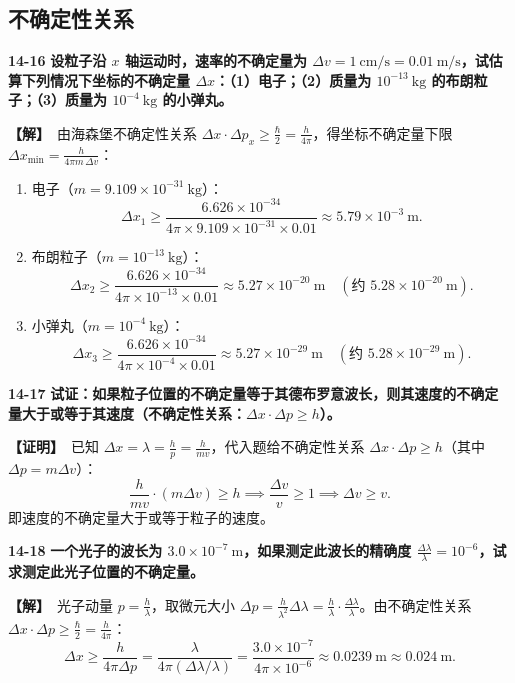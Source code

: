 \documentclass[zihao=5,a4paper,UTF8]{ctexart}
\newenvironment{prob}[2]{%
    \par\vspace{6pt}\noindent\textbf{\color{navy}#1} \textbf{#2}\par\nopagebreak\vspace{2pt}%
}{%
    \par\vspace{4pt}%
}
\newcommand{\sol}{\noindent\textbf{\color{tealaccent}【解】}\ }
\newcommand{\proofbegin}{\noindent\textbf{\color{tealaccent}【证明】}\ }
\begin{document}
\subsection{不确定性关系}

\begin{prob}{14-16}{设粒子沿 $x$ 轴运动时，速率的不确定量为 $\Delta v = 1\ \mathrm{cm/s} = 0.01\ \mathrm{m/s}$，试估算下列情况下坐标的不确定量 $\Delta x$：（1）电子；（2）质量为 $10^{-13}\ \mathrm{kg}$ 的布朗粒子；（3）质量为 $10^{-4}\ \mathrm{kg}$ 的小弹丸。}
\sol 由海森堡不确定性关系 $\Delta x\cdot \Delta p_x \ge \frac{\hbar}{2} = \frac{h}{4\pi}$，得坐标不确定量下限 $\Delta x_{\min} = \frac{h}{4\pi m\,\Delta v}$：
\begin{enumerate}[leftmargin=2em, itemsep=2pt]
    \item 电子（$m = 9.109\times 10^{-31}\ \mathrm{kg}$）：
    \[
        \Delta x_1 \ge \frac{6.626\times 10^{-34}}{4\pi\times 9.109\times 10^{-31}\times 0.01} \approx 5.79\times 10^{-3}\ \mathrm{m}.
    \]
    \item 布朗粒子（$m = 10^{-13}\ \mathrm{kg}$）：
    \[
        \Delta x_2 \ge \frac{6.626\times 10^{-34}}{4\pi\times 10^{-13}\times 0.01} \approx 5.27\times 10^{-20}\ \mathrm{m}\quad (\text{约 } 5.28\times 10^{-20}\ \mathrm{m}).
    \]
    \item 小弹丸（$m = 10^{-4}\ \mathrm{kg}$）：
    \[
        \Delta x_3 \ge \frac{6.626\times 10^{-34}}{4\pi\times 10^{-4}\times 0.01} \approx 5.27\times 10^{-29}\ \mathrm{m}\quad (\text{约 } 5.28\times 10^{-29}\ \mathrm{m}).
    \]
\end{enumerate}
\end{prob}

\begin{prob}{14-17}{试证：如果粒子位置的不确定量等于其德布罗意波长，则其速度的不确定量大于或等于其速度（不确定性关系：$\Delta x\cdot \Delta p \ge h$）。}
\proofbegin 已知 $\Delta x = \lambda = \frac{h}{p} = \frac{h}{mv}$，代入题给不确定性关系 $\Delta x\cdot \Delta p \ge h$（其中 $\Delta p = m\Delta v$）：
\[
    \frac{h}{mv}\cdot (m\Delta v) \ge h \implies \frac{\Delta v}{v} \ge 1 \implies \Delta v \ge v.
\]
即速度的不确定量大于或等于粒子的速度。
\end{prob}

\begin{prob}{14-18}{一个光子的波长为 $3.0\times 10^{-7}\ \mathrm{m}$，如果测定此波长的精确度 $\frac{\Delta\lambda}{\lambda} = 10^{-6}$，试求测定此光子位置的不确定量。}
\sol 光子动量 $p = \frac{h}{\lambda}$，取微元大小 $\Delta p = \frac{h}{\lambda^2}\Delta\lambda = \frac{h}{\lambda}\cdot\frac{\Delta\lambda}{\lambda}$。由不确定性关系 $\Delta x\cdot \Delta p \ge \frac{\hbar}{2} = \frac{h}{4\pi}$：
\[
    \Delta x \ge \frac{h}{4\pi \Delta p} = \frac{\lambda}{4\pi (\Delta\lambda / \lambda)} = \frac{3.0\times 10^{-7}}{4\pi\times 10^{-6}} \approx 0.0239\ \mathrm{m} \approx 0.024\ \mathrm{m}.
\]
\end{prob}
\end{document}
